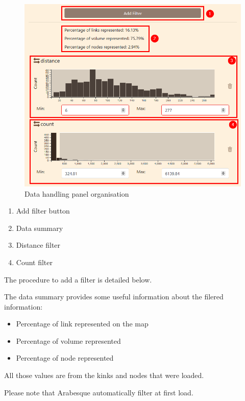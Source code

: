 \documentclass[]{book}
\providecommand{\tightlist}{%
  \setlength{\itemsep}{0pt}\setlength{\parskip}{0pt}}
\begin{document}
\begin{figure}
\centering
\includegraphics{images/functions/data_panel/01_data_panel_organisation.png}
\caption{Data handling panel organisation}
\end{figure}

\begin{enumerate}
\def\labelenumi{\arabic{enumi}.}
\tightlist
\item
  Add filter button
\item
  Data summary
\item
  Distance filter
\item
  Count filter
\end{enumerate}

The procedure to add a filter is detailed below.

The data summary provides some useful information about the filered information:

\begin{itemize}
\tightlist
\item
  Percentage of link represented on the map
\item
  Percentage of volume represented
\item
  Percentage of node represented
\end{itemize}

All those values are from the kinks and nodes that were loaded.

Please note that Arabesque automatically filter at first load.
\end{document}
